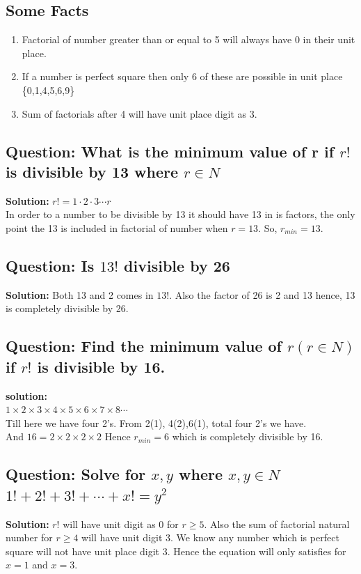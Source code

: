 \subsection*{Some Facts}
\begin{enumerate}
    \item Factorial of number greater than or equal to 5 will always have $0$ in their unit place.
    \item If a number is perfect square then only 6 of these are possible in unit place \{0,1,4,5,6,9\}
    \item Sum of factorials after 4 will have unit place digit as 3.
\end{enumerate}

\subsection*{Question: What is the minimum value of r if $r!$ is divisible by 13 where $r\in N$}
\textbf{Solution:} $r! = 1\cdot2\cdot3\cdots r$\\
In order to a number to be divisible by 13 it should have 13 in is factors, the only point the 13 is included in factorial of number when $r = 13$. So, $r_{min} = 13$.

\subsection*{Question: Is $13!$ divisible by 26}
\textbf{Solution: } Both 13 and 2 comes in $13!$. Also the factor of 26 is 2 and 13 hence, 13 is completely divisible by 26.

\subsection*{Question: Find the minimum value of $r(r \in N)$ if $r!$ is divisible by 16.}
\textbf{solution: } \\
$1 \times2 \times3 \times4 \times5 \times6 \times7 \times8 \cdots$ \\
Till here we have four 2's. 
From 2(1), 4(2),6(1), total four 2's we have.\\
And $16=2\times2\times2\times2$
Hence $r_{min} = 6$ which is completely divisible by 16.

\subsection*{Question: Solve for $x,y$ where $x,y \in N$ \\ $1!+2!+3!+\cdots+x! = y^2$ }
\textbf{Solution: } 
$r!$ will have unit digit as $0$ for $r \geq 5$. Also the sum of factorial natural number for $r \geq 4$ will have unit digit 3. We know any number which is perfect square will not have unit place digit 3. Hence the equation will only satisfies for $x=1$ and $x = 3$.

